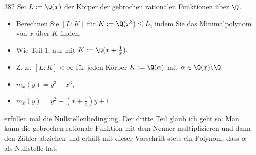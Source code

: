 \begin{algebraUE}{382}
  Sei $L := \Q(x)$ der Körper der gebrochen rationalen Funktionen über $\Q$.
  \begin{itemize}
      \item Berechnen Sie $[L:K]$ für $K:= \Q(x^3) \leq L$, indem Sie das Minimalpolynom von $x$ über $K$ finden.
      \item Wie Teil 1, nur mit $K := \Q(x+\frac{1}{x}).$
      \item Z. z.: $[L:K] < \infty$ für jeden Körper $K := \Q(\alpha)$ mit $\alpha \in \Q(x) \backslash \Q.$
  \end{itemize}
\end{algebraUE}

\begin{solution}
  \begin{itemize}
      \item $m_x(y) = y^3 - x^3,$
      \item $m_x(y) = y^2 - (x + \frac{1}{x})y + 1$
  \end{itemize}
  erfüllen mal die Nullstellenbedingung. Der dritte Teil glaub ich geht so: Man kann die gebrochen rationale Funktion mit dem Nenner multiplizieren und dann den Zähler abziehen und erhält mit dieser Vorschrift stets ein Polynom, dass $\alpha$ als Nullstelle hat.
\end{solution}
